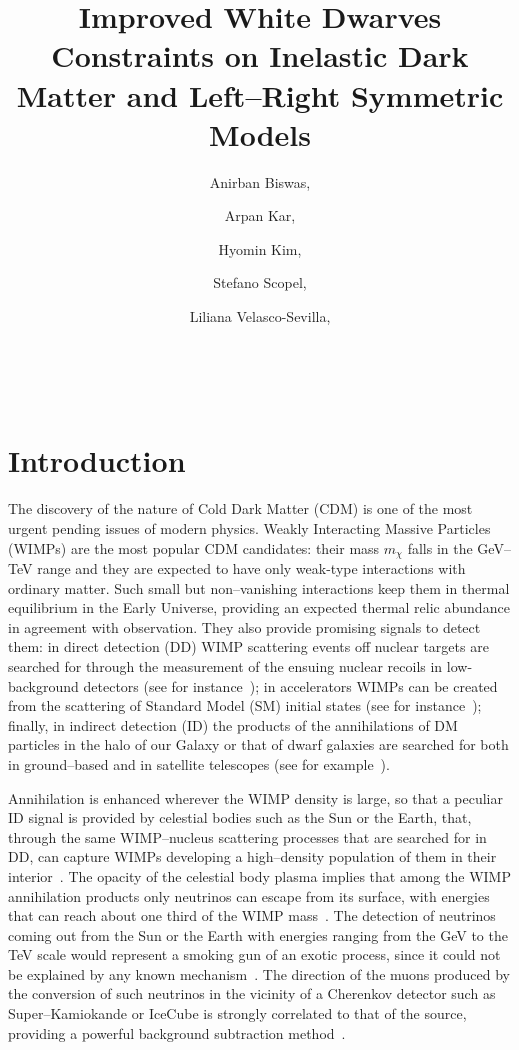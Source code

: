 \documentclass[11pt]{article}
\author[a,b]{Anirban Biswas,}
\author[a,b]{Arpan Kar,}
\author[a,b]{Hyomin Kim,}
\author[a,b]{Stefano Scopel,}
\author[a,b,c]{Liliana Velasco-Sevilla,}
\affiliation[a]{Center for Quantum Spacetime, Sogang University, Seoul 121-742, South Korea}
\affiliation[b]{Department of Physics, Sogang University, Seoul 121-742, South Korea}
\affiliation[c]{Korea Institute for Advanced Study, Seoul 02455, South Korea}
\title{Improved White Dwarves Constraints on Inelastic Dark Matter and Left--Right Symmetric Models}
\begin{document}
\hspace*{87.0mm}{CQUeST-2022-0691, KIAS  P22038}\\
\maketitle
\section{Introduction}
\label{sec:introduction}

The discovery of the nature of Cold Dark Matter (CDM) is one of the most urgent pending issues of modern physics. Weakly Interacting Massive Particles (WIMPs) 
are the most popular CDM candidates: their mass $m_\chi$ falls in the GeV–TeV range and they are expected to have only weak-type interactions with ordinary matter.  Such small but non--vanishing interactions keep them in thermal equilibrium in the Early Universe, providing an expected thermal relic abundance in agreement with observation. They also provide promising signals to detect them: in direct detection (DD) WIMP scattering events off nuclear targets are searched for through the measurement of the ensuing nuclear recoils in low-background detectors 
(see for instance~\cite{DD_Schumann2019, Snowmass_Leane2022}); in accelerators WIMPs can be created from the scattering of Standard Model (SM) initial states (see for instance~\cite{collider_Arcadi2017, collider_Boveia2018, collider_Giagu2019}); finally, in indirect detection (ID) the products of the annihilations of DM particles in the halo of our Galaxy or that of dwarf galaxies are searched for both in ground--based and in satellite telescopes 
(see for example~\cite{ID_Gaskins2016, ID_Strigari2018, ID_Leane2020, ID_PerezdelosHeros2020}). 

Annihilation is enhanced wherever the WIMP density is large, so that a peculiar ID signal is provided by celestial bodies such as the Sun or the Earth, that, through the same WIMP--nucleus scattering processes that are searched for in DD, can capture WIMPs developing a high--density population of them in their interior~\cite{capture_Press_Spergel, capture_Gould_1987ApJ, capture_Gould_1988ApJ, gould_capture_1991, dm_cap_sun_PhysRevD.86.073002, dm_capture_sun_Catena2015, dm_capture_sun_Brenner2020}. The opacity of the celestial body plasma implies that among the WIMP annihilation products only neutrinos can escape from its surface, with energies that can reach about one third of the WIMP mass~\cite{cap_nu_sun_PhysRevLett.55.257, cap_nu_sun_HAGELIN1986, dm_cap_nu_SREDNICKI1987, Jungman:1994jr}. The detection of neutrinos coming out from the Sun or the Earth with energies ranging from the GeV to the TeV scale would represent a smoking gun of an exotic process, since it could not be explained by any 
known mechanism~\cite{dm_cap_nu_PhysRevD.34.2206, JUNGMAN1996}. 
The direction of the muons produced by the conversion of such neutrinos in the vicinity of a Cherenkov detector such as Super--Kamiokande or IceCube is strongly correlated to that of the source, providing a powerful background subtraction method~\cite{Super-Kamiokande:2004pou, Super-Kamiokande:2015xms, IceCube:2016dgk}.
\end{document}
